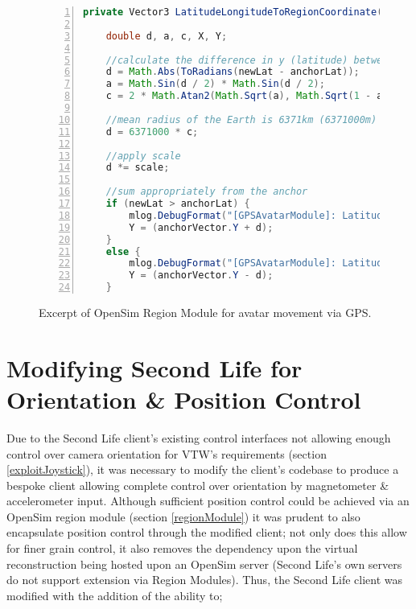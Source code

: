 \begin{figure}[h]
\begin{lstlisting}[language=Java, numbers=left, numberstyle=\small, stepnumber=1, frame=single, breaklines=true, backgroundcolor=\color{codebackground}, showstringspaces=false]
private Vector3 LatitudeLongitudeToRegionCoordinate(double newLat, double newLong, double anchorLat, double anchorLong, Vector3 anchorVector, double scale) {

    double d, a, c, X, Y;

    //calculate the difference in y (latitude) between the anchor & the new reading
    d = Math.Abs(ToRadians(newLat - anchorLat));
    a = Math.Sin(d / 2) * Math.Sin(d / 2);
    c = 2 * Math.Atan2(Math.Sqrt(a), Math.Sqrt(1 - a));

    //mean radius of the Earth is 6371km (6371000m)
    d = 6371000 * c;

    //apply scale
    d *= scale;

    //sum appropriately from the anchor
    if (newLat > anchorLat) {
        mlog.DebugFormat("[GPSAvatarModule]: LatitudeLongitudeToRegionCoordinate() - (Y) newLat > anchorLat.");
        Y = (anchorVector.Y + d);
    }
    else {
        mlog.DebugFormat("[GPSAvatarModule]: LatitudeLongitudeToRegionCoordinate() - (Y) newLat < anchorLat.");
        Y = (anchorVector.Y - d);
    }
\end{lstlisting}
\caption{Excerpt of OpenSim Region Module for avatar movement via GPS.}
\label{RegionModuleCode1}
\end{figure}




\section{Modifying Second Life for Orientation \& Position Control}

Due to the Second Life client's existing control interfaces not allowing enough control over camera orientation for VTW's requirements (section \ref{exploitJoystick}), it was necessary to modify the client's codebase to produce a bespoke client allowing complete control over orientation by magnetometer \& accelerometer input. Although sufficient position control could be achieved via an OpenSim region module (section \ref{regionModule}) it was prudent to also encapsulate position control through the modified client; not only does this allow for finer grain control, it also removes the dependency upon the virtual reconstruction being hosted upon an OpenSim server (Second Life's own servers do not support extension via Region Modules). Thus, the Second Life client was modified with the addition of the ability to;

